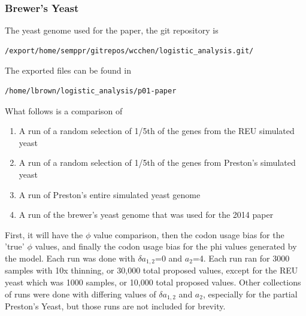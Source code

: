 \subsubsection{Brewer's Yeast}
The yeast genome used for the paper, the git repository is 
\begin{verbatim}
/export/home/semppr/gitrepos/wcchen/logistic_analysis.git/
\end{verbatim}

The exported files can be found in 

\begin{verbatim}
/home/lbrown/logistic_analysis/p01-paper
\end{verbatim}

What follows is a comparison of 

\begin{enumerate}
\item A run of a random selection of 1/5th of the genes from the REU simulated yeast
\item A run of a random selection of 1/5th of the genes from Preston's simulated yeast
\item A run of Preston's entire simulated yeast genome
\item A run of the brewer's yeast genome that was used for the 2014 paper
\end{enumerate}

First, it will have the $\phi$ value comparison, then the codon usage bias for the 'true' $\phi$ values, and finally the codon usage bias for the phi values generated by the model. Each run was done with $\delta a_{1,2}$=0 and $a_2$=4. Each run ran for 3000 samples with 10x thinning, or 30,000 total proposed values, except for the REU yeast which was 1000 samples, or 10,000 total proposed values. Other collections of runs were done with differing values of $\delta a_{1,2}$ and $a_2$, especially for the partial Preston's Yeast, but those runs are not included for brevity.

















